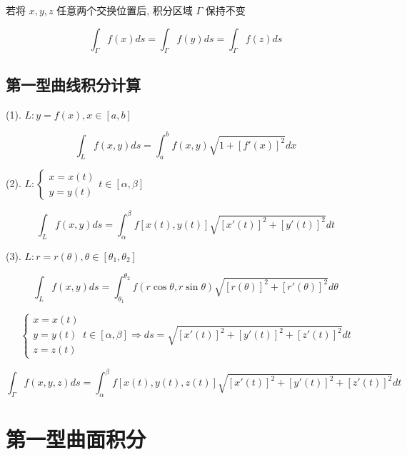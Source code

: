 \begin{definition}[轮换对称性]
	若将 $x,y,z$ 任意两个交换位置后, 积分区域 $\Gamma$ 保持不变

	$$\int_{\Gamma}f(x)ds=\int_{\Gamma}f(y)ds=\int_{\Gamma}f(z)ds$$
\end{definition}

\subsection{第一型曲线积分计算}

\begin{theorem}[平面曲线]
	
	(1). $L: y=f(x), x\in[a,b]$
	
	$$\int_{L}f(x,y)ds=\int_{a}^{b}f(x,y)\sqrt{1+[f'(x)]^2}dx$$
	
	(2). $L: \begin{cases}
		x = x(t)\\
		y = y(t)
	\end{cases} t\in[\alpha,\beta]$
	
	$$\int_{L}f(x,y)ds=\int_{\alpha}^{\beta}f\left[x(t),y(t)\right]\sqrt{[x'(t)]^2+[y'(t)]^2}dt$$
	
	(3). $L: r=r(\theta), \theta\in[\theta_{1},\theta_{2}]$
	
	$$\int_{L}f(x,y)ds=\int_{\theta_{1}}^{\theta_{2}}f(r\cos \theta,r\sin\theta)\sqrt{[r(\theta)]^2+[r'(\theta)]^2}d\theta$$
\end{theorem}
\begin{theorem}[空间曲线]
	
	$$\begin{cases}
		x = x(t)\\
		y = y(t)\\
		z = z(t)
	\end{cases} t\in[\alpha,\beta]\Rightarrow 
	ds=\sqrt{[x'(t)]^{2}+[y'(t)]^{2}+[z'(t)]^{2}}dt$$
	
	$$\int_{\Gamma}f(x,y,z)ds=\int_{\alpha}^{\beta}f \left[ x(t),y(t),z(t)\right]\sqrt{[x'(t)]^{2}+[y'(t)]^{2}+[z'(t)]^{2}}dt$$
\end{theorem}

\section{第一型曲面积分}
